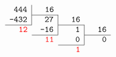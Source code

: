 \documentclass{article}
\newcommand\ttnum[1]{\texttt{#1}}
\newcommand\mr[1]{\multicolumn{1}{r|}{\ttnum{#1}}}
\newcommand\mc[1]{\multicolumn{1}{wr{\widthof{\ttnum{-432}}}}{\ttnum{#1}}}
\newcommand\red[1]{\multicolumn{1}{r}{\textcolor{red}{\ttnum{#1}}}}
\begin{document}
\pagestyle{empty}
\Large
\setlength\arraycolsep{1pt} %
\[
\begin{array}{@{} *{12}{r} @{}}
\mr{444} & \mc{16} \\
\cline{2-2}
\mr{-432} & \mr{27} & \mc{16} \\
\cline{1-1} \cline{3-3}
\red{12} & \mr{-16} & \mr{1} & \mc{16} \\
\cline{2-2} \cline{4-4}
& \red{11} & \mr{0} & \mc{0} \\
\cline{3-3}
& & \red{1}
\end{array}
\]
\end{document}
